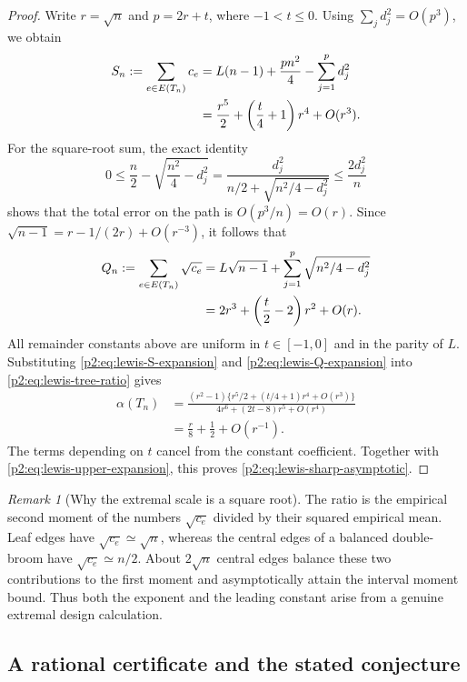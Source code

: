 \documentclass[11pt,a4paper]{article}
\theoremstyle{definition}
\theoremstyle{remark}
\newtheorem{remark}[theorem]{Remark}
\numberwithin{equation}{section}
\begin{document}
\begin{proof}
Write $r=\sqrt n$ and $p=2r+t$, where $-1<t\leq0$.
Using $\sum_jd_j^2=O(p^3)$, we obtain
\begin{align}
 S_n:=\sum_{e\in E(T_n)}c_e
 &=L(n-1)+\frac{pn^2}{4}-\sum_{j=1}^{p}d_j^2\notag\\
 &=\frac{r^5}{2}+\left(\frac t4+1\right)r^4+O(r^3).
 \label{p2:eq:lewis-S-expansion}
\end{align}
For the square-root sum, the exact identity
\[
 0\leq\frac n2-\sqrt{\frac{n^2}{4}-d_j^2}
 =\frac{d_j^2}{n/2+\sqrt{n^2/4-d_j^2}}
 \leq\frac{2d_j^2}{n}
\]
shows that the total error on the path is $O(p^3/n)=O(r)$.
Since $\sqrt{n-1}=r-1/(2r)+O(r^{-3})$, it follows that
\begin{align}
 Q_n:=\sum_{e\in E(T_n)}\sqrt{c_e}
 &=L\sqrt{n-1}+\sum_{j=1}^{p}\sqrt{n^2/4-d_j^2}\notag\\
 &=2r^3+\left(\frac t2-2\right)r^2+O(r).
 \label{p2:eq:lewis-Q-expansion}
\end{align}
All remainder constants above are uniform in $t\in[-1,0]$ and in the
parity of $L$.
Substituting \eqref{p2:eq:lewis-S-expansion} and
\eqref{p2:eq:lewis-Q-expansion} into \eqref{p2:eq:lewis-tree-ratio} gives
\begin{align*}
 \alpha(T_n)
 &=\frac{(r^2-1)
       \{r^5/2+(t/4+1)r^4+O(r^3)\}}
       {4r^6+(2t-8)r^5+O(r^4)}\\
 &=\frac r8+\frac12+O(r^{-1}).
\end{align*}
The terms depending on $t$ cancel from the constant coefficient.
Together with \eqref{p2:eq:lewis-upper-expansion}, this proves
\eqref{p2:eq:lewis-sharp-asymptotic}.
\end{proof}

\begin{remark}[Why the extremal scale is a square root]
The ratio is the empirical second moment of the numbers
$\sqrt{c_e}$ divided by their squared empirical mean.
Leaf edges have $\sqrt{c_e}\simeq\sqrt n$, whereas the central edges of
a balanced double-broom have $\sqrt{c_e}\simeq n/2$.
About $2\sqrt n$ central edges balance these two contributions to the
first moment and asymptotically attain the interval moment bound.
Thus both the exponent and the leading constant arise from a genuine
extremal design calculation.
\end{remark}

\subsection{A rational certificate and the stated conjecture}
\end{document}
